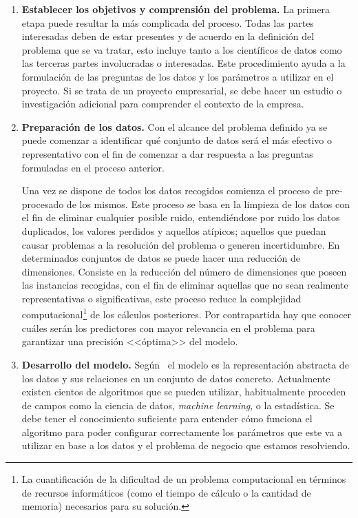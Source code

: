 
\begin{enumerate}
   \item \textbf{Establecer los objetivos y comprensión del problema.}
    La primera etapa puede resultar la más complicada del proceso. Todas las partes interesadas deben de estar presentes y de acuerdo en la definición del problema que se va tratar, esto incluye tanto a los científicos de datos como las terceras partes involucradas o interesadas. 
    Este procedimiento ayuda a la formulación de las preguntas de los datos y los parámetros a utilizar en el proyecto. Si se trata de un proyecto empresarial, se debe hacer un estudio o investigación adicional para comprender el contexto de la empresa.
    \item \textbf{Preparación de los datos.}
    Con el alcance del problema definido ya se puede comenzar a identificar qué conjunto de datos será el más efectivo o representativo con el fin de comenzar a dar respuesta a las preguntas formuladas en el proceso anterior.
    
    Una vez se dispone de todos los datos recogidos comienza el proceso de pre-procesado de los mismos. Este proceso se basa en la limpieza de los datos con el fin de eliminar cualquier posible ruido, entendiéndose por ruido los datos duplicados, los valores perdidos y aquellos atípicos; aquellos que puedan causar problemas a la resolución del problema o generen incertidumbre.
    En determinados conjuntos de datos se puede hacer una reducción de dimensiones. Consiste en la reducción del número de dimensiones que poseen las instancias recogidas, con el fin de eliminar aquellas que no sean realmente representativas o significativas, este proceso reduce la complejidad computacional\footnote{La cuantificación de la dificultad de un problema computacional en términos de recursos informáticos (como el tiempo de cálculo o la cantidad de memoria) necesarios para su solución.} de los cálculos posteriores. Por contrapartida hay que conocer cuáles serán los predictores con mayor relevancia en el problema para garantizar una precisión <<óptima>> del modelo.
    \item \textbf{Desarrollo del modelo.}
    Según~\cite{KOTU201517} el modelo es la representación abstracta de los datos y sus relaciones en un conjunto de datos concreto. Actualmente existen cientos de algoritmos que se pueden utilizar, habitualmente proceden de campos como la ciencia de datos, \textit{machine learning}, o la estadística.
    Se debe tener el conocimiento suficiente para entender cómo funciona el algoritmo para poder configurar correctamente los parámetros que este va a utilizar en base a los datos y el problema de negocio que estamos resolviendo. 
    

\end{enumerate}

